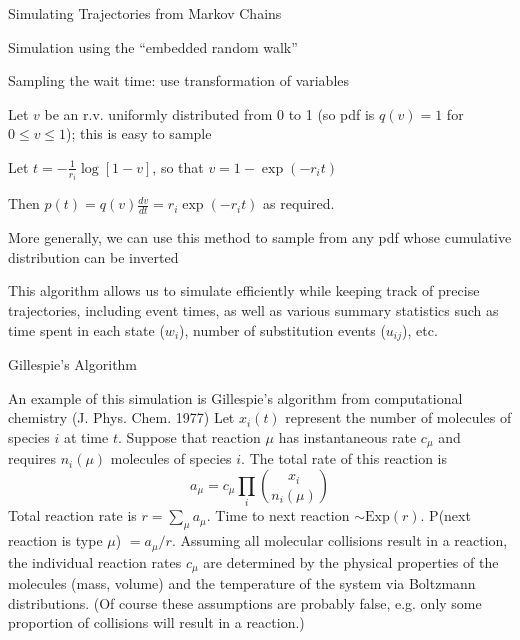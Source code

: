 \documentclass{beamer}
\begin{document}
\begin{frame}{Simulating Trajectories from Markov Chains}

\itemb
\item Simulation using the ``embedded random walk''
 \itemb
 \item Sampling the wait time: use \alert{transformation of variables}
  \itemb
  \item Let $v$ be an r.v. uniformly distributed from 0 to 1 (so pdf is $q(v)=1$ for $0 \leq v \leq 1$); this is easy to sample
\pause
  \item Let $t=-\frac{1}{r_i}\log [1-v]$, so that $v = 1 - \exp(-r_i t)$
\pause
  \item Then $p(t) = q(v) \frac{dv}{dt} = r_i \exp(-r_i t)$ as required.
\pause
  \item More generally, we can use this method to sample from any pdf whose cumulative distribution can be inverted
  \iteme
\pause
 \item This algorithm allows us to simulate efficiently while keeping track of precise trajectories, including event times,
as well as various summary statistics such as time spent in each state ($w_i$), number of substitution events ($u_{ij}$), etc.
 \iteme
\iteme

\end{frame}

\begin{frame}{Gillespie's Algorithm}

\small

 An example of this simulation is \alert{Gillespie's algorithm} from computational chemistry (J. Phys. Chem. 1977)
 Let $x_i(t)$ represent the number of molecules of species $i$ at time $t$.
Suppose that reaction $\mu$ has instantaneous rate $c_\mu$ and requires $n_i(\mu)$ molecules of species $i$.
The total rate of this reaction is
\[
a_\mu = c_\mu \prod_i \binom{x_i}{n_i(\mu)}
\]
Total reaction rate is $r = \sum_\mu a_\mu$.
Time to next reaction $\sim \mbox{Exp}(r)$.
P(next reaction is type $\mu$) $= a_\mu/r$.
Assuming all molecular collisions result in a reaction, the individual reaction rates $c_\mu$
are determined by the physical properties of the molecules (mass, volume) and the temperature of the system
via Boltzmann distributions.
(Of course these assumptions are probably false, e.g. only some proportion of collisions will result in a reaction.)

\end{frame}
\end{document}
